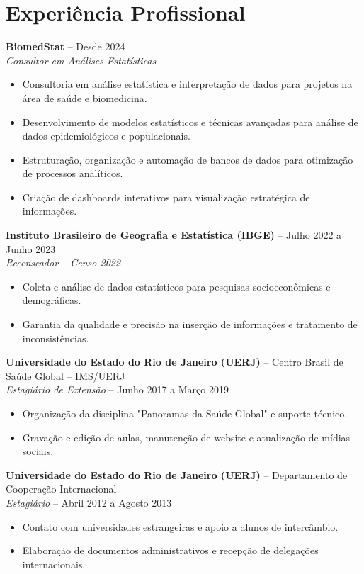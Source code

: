 \documentclass[a4paper,12pt]{article}
\begin{document}
\section*{Experiência Profissional}
\textbf{BiomedStat} – Desde 2024 \\
\textit{Consultor em Análises Estatísticas} \\
\begin{itemize}[leftmargin=*]
    \item Consultoria em análise estatística e interpretação de dados para projetos na área de saúde e biomedicina.
    \item Desenvolvimento de modelos estatísticos e técnicas avançadas para análise de dados epidemiológicos e populacionais.
    \item Estruturação, organização e automação de bancos de dados para otimização de processos analíticos.
    \item Criação de dashboards interativos para visualização estratégica de informações.
\end{itemize}

\textbf{Instituto Brasileiro de Geografia e Estatística (IBGE)} – Julho 2022 a Junho 2023 \\
\textit{Recenseador – Censo 2022} \\
\begin{itemize}[leftmargin=*]
    \item Coleta e análise de dados estatísticos para pesquisas socioeconômicas e demográficas.
    \item Garantia da qualidade e precisão na inserção de informações e tratamento de inconsistências.
\end{itemize}

\textbf{Universidade do Estado do Rio de Janeiro (UERJ)} – Centro Brasil de Saúde Global – IMS/UERJ \\
\textit{Estagiário de Extensão} – Junho 2017 a Março 2019 \\
\begin{itemize}[leftmargin=*]
    \item Organização da disciplina "Panoramas da Saúde Global" e suporte técnico.
    \item Gravação e edição de aulas, manutenção de website e atualização de mídias sociais.
\end{itemize}

\textbf{Universidade do Estado do Rio de Janeiro (UERJ)} – Departamento de Cooperação Internacional \\
\textit{Estagiário} – Abril 2012 a Agosto 2013 \\
\begin{itemize}[leftmargin=*]
    \item Contato com universidades estrangeiras e apoio a alunos de intercâmbio.
    \item Elaboração de documentos administrativos e recepção de delegações internacionais.
\end{itemize}
\end{document}
